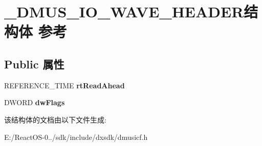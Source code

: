 \hypertarget{struct___d_m_u_s___i_o___w_a_v_e___h_e_a_d_e_r}{}\section{\+\_\+\+D\+M\+U\+S\+\_\+\+I\+O\+\_\+\+W\+A\+V\+E\+\_\+\+H\+E\+A\+D\+E\+R结构体 参考}
\label{struct___d_m_u_s___i_o___w_a_v_e___h_e_a_d_e_r}
\subsection*{Public 属性}
\begin{DoxyCompactItemize}
\item 
\mbox{\label{struct___d_m_u_s___i_o___w_a_v_e___h_e_a_d_e_r_a0c7b4fa452bdc99ca395b32711419c3c}} 
R\+E\+F\+E\+R\+E\+N\+C\+E\+\_\+\+T\+I\+ME {\bfseries rt\+Read\+Ahead}
\item 
\mbox{\label{struct___d_m_u_s___i_o___w_a_v_e___h_e_a_d_e_r_a0def33670831e62d39398272e3d89e87}} 
D\+W\+O\+RD {\bfseries dw\+Flags}
\end{DoxyCompactItemize}


该结构体的文档由以下文件生成\+:\begin{DoxyCompactItemize}
\item 
E\+:/\+React\+O\+S-\/0../sdk/include/dxsdk/dmusicf.\+h\end{DoxyCompactItemize}
